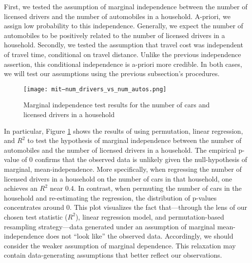 First, we tested the assumption of marginal independence between the number of licensed drivers and the number of automobiles in a household.
A-priori, we assign low probability to this independence.
Generally, we expect the number of automobiles to be positively related to the number of licensed drivers in a household.
Secondly, we tested the assumption that travel cost was independent of travel time, conditional on travel distance.
Unlike the previous independence assertion, this conditional independence is a-priori more credible.
In both cases, we will test our assumptions using the previous subsection's procedures.

\begin{figure}
   \centering
   \texttt{[image: mit--num\_drivers\_vs\_num\_autos.png]}
   \caption{Marginal independence test results for the number of cars and licensed drivers in a household}
   \label{fig:marginal-independence-test}
\end{figure}

In particular, Figure \ref{fig:marginal-independence-test} shows the results of using permutation, linear regression, and $R^2$ to test the hypothesis of marginal independence between the number of automobiles and the number of licensed drivers in a household.
The empirical p-value of 0 confirms that the observed data is unlikely given the null-hypothesis of marginal, mean-independence.
More specifically, when regressing the number of licensed drivers in a household on the number of cars in that household, one achieves an $R^2$ near 0.4.
In contrast, when permuting the number of cars in the household and re-estimating the regression, the distribution of p-values concentrates around 0.
This plot visualizes the fact that---through the lens of our chosen test statistic ($R^2$), linear regression model, and permutation-based resampling strategy---data generated under an assumption of marginal mean-independence does not ``look like'' the observed data.
Accordingly, we should consider the weaker assumption of marginal dependence.
This relaxation may contain data-generating assumptions that better reflect our observations.

